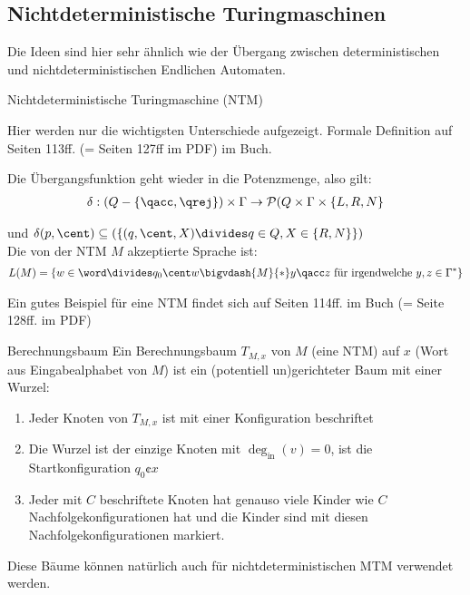 \newpage
\subsection{Nichtdeterministische Turingmaschinen}
Die Ideen sind hier sehr ähnlich wie der Übergang zwischen deterministischen und nichtdeterministischen Endlichen Automaten.

\begin{definition}[]{Nichtdeterministische Turingmaschine (NTM)}
    \begin{scriptsize}
        Hier werden nur die wichtigsten Unterschiede aufgezeigt. Formale Definition auf Seiten 113ff. (= Seiten 127ff im PDF) im Buch.
    \end{scriptsize}

    Die Übergangsfunktion geht wieder in die Potenzmenge, also gilt:
    \rmvspace
    \begin{align*}
        \delta : (Q - \{ \qacc, \qrej \}) \times \Gamma \rightarrow \mathcal{P}(Q \times \Gamma \times \{ L, R, N \}
    \end{align*}

    \rmvspace
    und $\delta(p, \cent) \subseteq (\{ (q, \cent, X) \divides q \in Q, X \in \{R, N\} \})$\\

    Die von der NTM $M$ akzeptierte Sprache ist:
    \rmvspace
    \begin{align*}
        L(M) = \{ w \in \word \divides q_0\cent w \bigvdash{M}{*}y\qacc z \text{ für irgendwelche } y, z \in \Gamma^* \}
    \end{align*}
\end{definition}
Ein gutes Beispiel für eine NTM findet sich auf Seiten 114ff. im Buch (= Seite 128ff. im PDF)


\begin{definition}[]{Berechnungsbaum}
    Ein Berechnungsbaum $T_{M, x}$ von $M$ (eine NTM) auf $x$ (Wort aus Eingabealphabet von $M$) ist ein (potentiell un)gerichteter Baum mit einer Wurzel:
    \begin{enumerate}[label=\textit{(\roman*)}]
        \item Jeder Knoten von $T_{M, x}$ ist mit einer Konfiguration beschriftet
        \item Die Wurzel ist der einzige Knoten mit $\deg_{\text{in}}(v) = 0$, ist die Startkonfiguration $q_0\cent x$
        \item Jeder mit $C$ beschriftete Knoten hat genauso viele Kinder wie $C$ Nachfolgekonfigurationen hat und die Kinder sind mit diesen Nachfolgekonfigurationen markiert.
    \end{enumerate}
\end{definition}
Diese Bäume können natürlich auch für nichtdeterministischen MTM verwendet werden.

